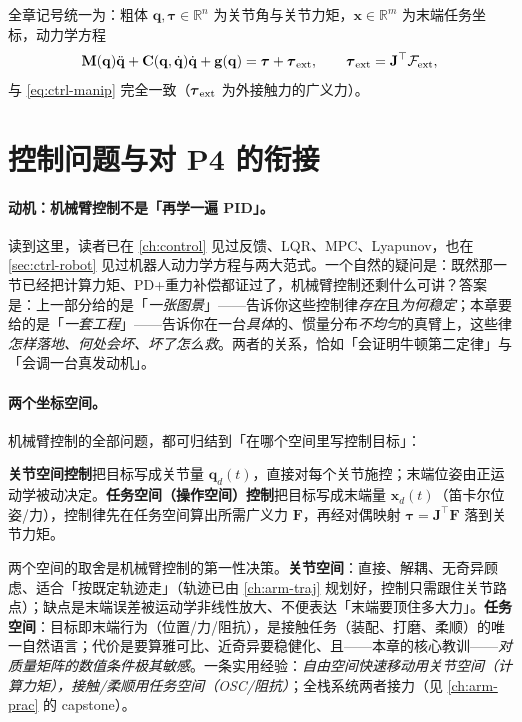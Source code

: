 \noindent 全章记号统一为：粗体 $\mathbf{q},\boldsymbol{\tau}\in\mathbb{R}^n$ 为关节角与关节力矩，$\mathbf{x}\in\mathbb{R}^m$ 为末端任务坐标，动力学方程
\begin{equation}
  \mathbf{M}(\mathbf{q})\ddot{\mathbf{q}}+\mathbf{C}(\mathbf{q},\dot{\mathbf{q}})\dot{\mathbf{q}}+\mathbf{g}(\mathbf{q})=\boldsymbol{\tau}+\boldsymbol{\tau}_{\rm ext},\qquad \boldsymbol{\tau}_{\rm ext}=\mathbf{J}^\top\mathcal{F}_{\rm ext},
  \label{eq:actrl-manip}
\end{equation}
与 \cref{eq:ctrl-manip} 完全一致（$\boldsymbol{\tau}_{\rm ext}$ 为外接触力的广义力）。

\section{控制问题与对 P4 的衔接}
\label{sec:actrl-bridge}

\paragraph{动机：机械臂控制不是「再学一遍 PID」。}
读到这里，读者已在 \cref{ch:control} 见过反馈、LQR、MPC、Lyapunov，也在 \cref{sec:ctrl-robot} 见过机器人动力学方程与两大范式。一个自然的疑问是：既然那一节已经把计算力矩、PD+重力补偿都证过了，机械臂控制还剩什么可讲？答案是：上一部分给的是「\emph{一张图景}」——告诉你这些控制律\emph{存在}且\emph{为何稳定}；本章要给的是「\emph{一套工程}」——告诉你在一台\emph{具体}的、惯量分布\emph{不均匀}的真臂上，这些律\emph{怎样落地、何处会坏、坏了怎么救}。两者的关系，恰如「会证明牛顿第二定律」与「会调一台真发动机」。

\paragraph{两个坐标空间。}
机械臂控制的全部问题，都可归结到「在哪个空间里写控制目标」：

\begin{definition}[关节空间控制与任务空间控制]
\label{def:actrl-spaces}
\textbf{关节空间控制}把目标写成关节量 $\mathbf{q}_d(t)$，直接对每个关节施控；末端位姿由正运动学被动决定。\textbf{任务空间（操作空间）控制}把目标写成末端量 $\mathbf{x}_d(t)$（笛卡尔位姿/力），控制律先在任务空间算出所需广义力 $\mathbf{F}$，再经对偶映射 $\boldsymbol{\tau}=\mathbf{J}^\top\mathbf{F}$ 落到关节力矩。
\end{definition}

\begin{insight}
两个空间的取舍是机械臂控制的第一性决策。\textbf{关节空间}：直接、解耦、无奇异顾虑、适合「按既定轨迹走」（轨迹已由 \cref{ch:arm-traj} 规划好，控制只需跟住关节路点）；缺点是末端误差被运动学非线性放大、不便表达「末端要顶住多大力」。\textbf{任务空间}：目标即末端行为（位置/力/阻抗），是接触任务（装配、打磨、柔顺）的唯一自然语言；代价是要算雅可比、近奇异要稳健化、且——本章的核心教训——\emph{对质量矩阵的数值条件极其敏感}。一条实用经验：\emph{自由空间快速移动用关节空间（计算力矩），接触/柔顺用任务空间（OSC/阻抗）}；全栈系统两者接力（见 \cref{ch:arm-prac} 的 capstone）。
\end{insight}

